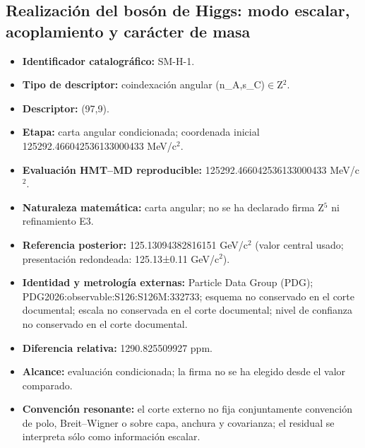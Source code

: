 \subsection{Realización del bosón de Higgs: modo escalar, acoplamiento y carácter de masa}
\begin{itemize}
\item \textbf{Identificador catalográfico:} SM-H-1.
\item \textbf{Tipo de descriptor:} coindexación angular (n\_A,s\_C)\(\in\)Z\({}^{2}\).
\item \textbf{Descriptor:} (97,9).
\item \textbf{Etapa:} carta angular condicionada; coordenada inicial 125292.466042\allowbreak{}536133\allowbreak{}000433 MeV/c\({}^{2}\).
\item \textbf{Evaluación HMT--MD reproducible:} 125292.466042\allowbreak{}536133\allowbreak{}000433 MeV/c\({}^{2}\).
\item \textbf{Naturaleza matemática:} carta angular; no se ha declarado firma Z\({}^{5}\) ni refinamiento E3.
\item \textbf{Referencia posterior:} 125.130943\allowbreak{}828161\allowbreak{}51 GeV/c\({}^{2}\) (valor central usado; presentación redondeada: 125.13±\allowbreak{}0.11 GeV/c\({}^{2}\)).
\item \textbf{Identidad y metrología externas:} Particle Data Group (PDG); PDG2026:\allowbreak{}observable:\allowbreak{}S126:\allowbreak{}S126M:\allowbreak{}332733; esquema no conservado en el corte documental; escala no conservada en el corte documental; nivel de confianza no conservado en el corte documental.
\item \textbf{Diferencia relativa:} 1290.825509\allowbreak{}927 ppm.
\item \textbf{Alcance:} evaluación condicionada; la firma no se ha elegido desde el valor comparado.
\item \textbf{Convención resonante:} el corte externo no fija conjuntamente convención de polo, Breit--Wigner o sobre capa, anchura y covarianza; el residual se interpreta sólo como información escalar.
\end{itemize}
